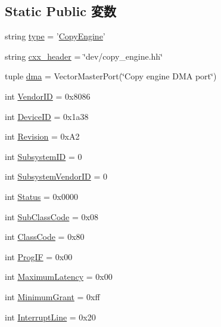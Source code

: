 \subsection*{Static Public 変数}
\begin{DoxyCompactItemize}
\item 
string \hyperlink{classCopyEngine_1_1CopyEngine_acce15679d830831b0bbe8ebc2a60b2ca}{type} = '\hyperlink{classCopyEngine_1_1CopyEngine}{CopyEngine}'
\item 
string \hyperlink{classCopyEngine_1_1CopyEngine_a17da7064bc5c518791f0c891eff05fda}{cxx\_\-header} = \char`\"{}dev/copy\_\-engine.hh\char`\"{}
\item 
tuple \hyperlink{classCopyEngine_1_1CopyEngine_abdac2228870fba23068128b66c85f31f}{dma} = VectorMasterPort(\char`\"{}Copy engine DMA port\char`\"{})
\item 
int \hyperlink{classCopyEngine_1_1CopyEngine_a96ec1b4422f12f72160a0633ada47217}{VendorID} = 0x8086
\item 
int \hyperlink{classCopyEngine_1_1CopyEngine_a4a8ed9a0233fc6d0ce178569c4de25d0}{DeviceID} = 0x1a38
\item 
int \hyperlink{classCopyEngine_1_1CopyEngine_a1c872d7167f0869b85418babe0ca6ced}{Revision} = 0xA2
\item 
int \hyperlink{classCopyEngine_1_1CopyEngine_a4d1c38afb909fcd8a72313e8feb9b9e1}{SubsystemID} = 0
\item 
int \hyperlink{classCopyEngine_1_1CopyEngine_a6b551917884afdfa2108dc0574bcd1e1}{SubsystemVendorID} = 0
\item 
int \hyperlink{classCopyEngine_1_1CopyEngine_ae58c2415cf1178457fa1254234c3f017}{Status} = 0x0000
\item 
int \hyperlink{classCopyEngine_1_1CopyEngine_a6537e94b8ab06acd357673ec1699adc8}{SubClassCode} = 0x08
\item 
int \hyperlink{classCopyEngine_1_1CopyEngine_a7d0125d1930fad943a6a7471da0317ad}{ClassCode} = 0x80
\item 
int \hyperlink{classCopyEngine_1_1CopyEngine_aa63e82532e33e89795f472cfb7e0bb67}{ProgIF} = 0x00
\item 
int \hyperlink{classCopyEngine_1_1CopyEngine_a10460b79882894b983aca9f848f4ffaf}{MaximumLatency} = 0x00
\item 
int \hyperlink{classCopyEngine_1_1CopyEngine_a1f3ebd5623021488fb0bfa84f5aa357d}{MinimumGrant} = 0xff
\item 
int \hyperlink{classCopyEngine_1_1CopyEngine_a4c885b3ef4f7d1a88903aabcce7a943e}{InterruptLine} = 0x20
\item 

\end{DoxyCompactItemize}
